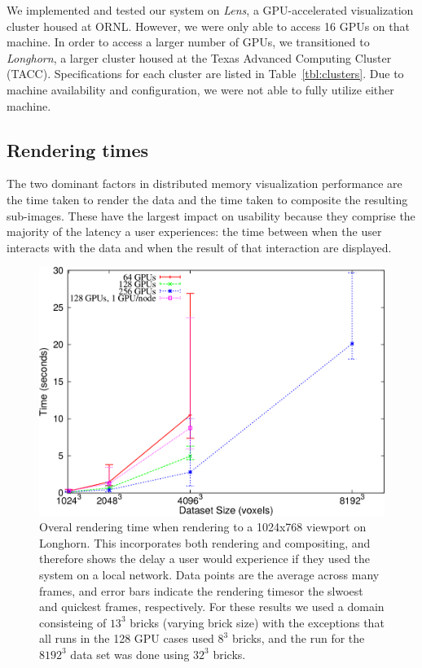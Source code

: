 We implemented and tested our system on \textit{Lens}, a GPU-accelerated
visualization cluster housed at ORNL.  However, we were only able to access 16
GPUs on that machine.  In order to access a larger number of GPUs, we
transitioned to \textit{Longhorn}, a larger cluster housed at the Texas
Advanced Computing Cluster (TACC).  Specifications for each cluster are listed
in Table~\ref{tbl:clusters}.  Due to machine availability and configuration, we
were not able to fully utilize either machine.

\subsection{Rendering times}

The two dominant factors in distributed memory visualization
performance are the time taken to render the data and the time taken
to composite the resulting sub-images.  These have the largest impact
on usability because they comprise the majority of the latency a user
experiences: the time between when the user interacts with the data and
when the result of that interaction are displayed.

\begin{figure}
  \includegraphics[width=\linewidth]{images/multiscale/rtime}

  \caption{Overal rendering time when rendering to a 1024x768 viewport
  on Longhorn.  This incorporates both rendering and compositing, and
  therefore shows the delay a user would experience if they used the
  system on a local network. Data points are the average across many
  frames, and error bars indicate the rendering timesor the slwoest and
  quickest frames, respectively.  For these results we used a domain
  consisteing of $13^3$ bricks (varying brick size) with the exceptions
  that all runs in the 128 GPU cases used $8^3$ bricks, and the run for
  the $8192^3$ data set was done using $32^3$ bricks.}
  \label{fig:rtime}
\end{figure}

